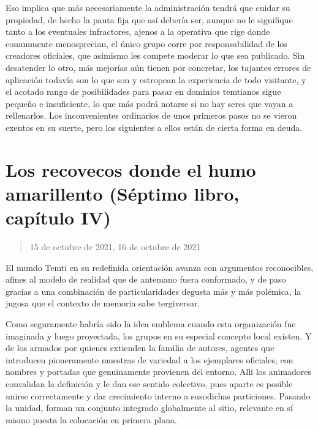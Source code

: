 \documentclass[
]{book}
\begin{document}
Eso implica que más necesariamente la administración tendrá que cuidar su propiedad, de hecho la pauta fija que así debería ser, aunque no le signifique tanto a los eventuales infractores, ajenos a la operativa que rige donde comunmente menosprecian, el único grupo corre por responsabilidad de los creadores oficiales, que asimismo les compete moderar lo que sea publicado. Sin desatender lo otro, más mejorías aún tienen por concretar, los tajantes errores de aplicación todavía son lo que son y estropean la experiencia de todo visitante, y el acotado rango de posibilidades para pasar en dominios temtianos sigue pequeño e insuficiente, lo que más podrá notarse si no hay seres que vayan a rellenarlos. Los inconvenientes ordinarios de unos primeros pasos no se vieron exentos en su suerte, pero los siguientes a ellos están de cierta forma en deuda.

\hypertarget{los-recovecos-donde-el-humo-amarillento-suxe9ptimo-libro-capuxedtulo-iv}{%
\section{Los recovecos donde el humo amarillento (Séptimo libro, capítulo IV)}\label{los-recovecos-donde-el-humo-amarillento-suxe9ptimo-libro-capuxedtulo-iv}}

\begin{quote}
15 de octubre de 2021, 16 de octubre de 2021
\end{quote}

El mundo Temti en su redefinida orientación avanza con argumentos reconocibles, afines al modelo de realidad que de antemano fuera conformado, y de paso gracias a una combinación de particularidades degusta más y más polémica, la jugosa que el contexto de memoria sabe tergiversar.

Como seguramente habría sido la idea emblema cuando esta organización fue imaginada y luego proyectada, los grupos en su especial concepto local existen. Y de los armados por quienes extienden la familia de autores, agentes que introducen pioneramente muestras de variedad a los ejemplares oficiales, con nombres y portadas que genuinamente provienen del entorno. Allí los animadores convalidan la definición y le dan ese sentido colectivo, pues aparte es posible unirse correctamente y dar crecimiento interno a susodichas particiones. Pasando la unidad, forman un conjunto integrado globalmente al sitio, relevante en sí mismo puesta la colocación en primera plana.
\end{document}
